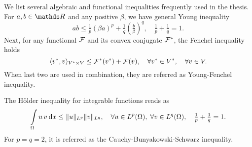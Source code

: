 
\noindent
We list several algebraic and functional inequalities frequently used in the 
thesis. For $a, b \in \Real$ and any positive $\beta$, we have general Young 
inequality
%
\begin{equation}
a b \leq \tfrac{1}{p} (\beta a)^p + \tfrac{1}{q} (\tfrac{b}{\beta})^q, \quad
\tfrac{1}{p} + \tfrac{1}{q} = 1.
\label{eq:young-inequality}
\end{equation}
%
Next, for any functional $\mathcal{F}$ and its convex conjugate $\mathcal{F}^*$, the Fenchel inequality 
holds 
%
\begin{equation}
\langle v^*, v \rangle_{V^* \times V } \leq \F^*(v^*) + \F(v), 
\quad \forall v^* \in V^*, \quad \forall v \in V.
\label{eq:young-fenchel-inequality}
\end{equation}
%
When last two are used in combination, they are referred as Young-Fenchel 
inequality.

\noindent
The H\"{o}lder inequality for integrable functions reads as
%
\begin{equation}
\Int_{\Omega} u \,v \dx \leq \| u \|_{\L{p}} \| v\|_{\L{q}}, \quad
\forall u \in \L{p}(\Omega), \; \forall v \in \L{q}(\Omega), \quad
\tfrac{1}{p} + \tfrac{1}{q} = 1.
\label{eq:holder-inequality}
\end{equation}
%
For $p = q = 2$, it is referred as the Cauchy-Bunyakowski-Schwarz inequality. 

